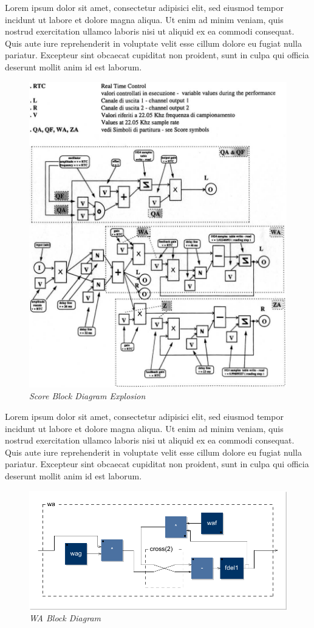 \documentclass[twoside,a4paper]{article}
\begin{document}
Lorem ipsum dolor sit amet, consectetur adipisici elit, sed eiusmod tempor
incidunt ut labore et dolore magna aliqua. Ut enim ad minim veniam, quis
nostrud exercitation ullamco laboris nisi ut aliquid ex ea commodi consequat.
Quis aute iure reprehenderit in voluptate velit esse cillum dolore eu fugiat
nulla pariatur. Excepteur sint obcaecat cupiditat non proident, sunt in culpa
qui officia deserunt mollit anim id est laborum.

\begin{figure}[ht]
\centerline{\includegraphics[width=.45\textwidth]{img/2-comp}}
\caption{\label{ml-dia-exp}{\it Score Block Diagram Explosion}}
\end{figure}

Lorem ipsum dolor sit amet, consectetur adipisici elit, sed eiusmod tempor
incidunt ut labore et dolore magna aliqua. Ut enim ad minim veniam, quis
nostrud exercitation ullamco laboris nisi ut aliquid ex ea commodi consequat.
Quis aute iure reprehenderit in voluptate velit esse cillum dolore eu fugiat
nulla pariatur. Excepteur sint obcaecat cupiditat non proident, sunt in culpa
qui officia deserunt mollit anim id est laborum.

\begin{figure}[ht]
\centerline{\includegraphics[width=.45\textwidth]{img/wa}}
\caption{\label{wa-block}{\it WA Block Diagram}}
\end{figure}


\end{document}

